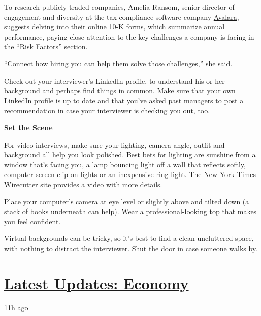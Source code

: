 To research publicly traded companies, Amelia Ransom, senior director of
engagement and diversity at the tax compliance software company
\href{https://www.avalara.com/us/en/index.html}{Avalara}, suggests
delving into their online 10-K forms, which summarize annual
performance, paying close attention to the key challenges a company is
facing in the ``Risk Factors'' section.

``Connect how hiring you can help them solve those challenges,'' she
said.

Check out your interviewer's LinkedIn profile, to understand his or her
background and perhaps find things in common. Make sure that your own
LinkedIn profile is up to date and that you've asked past managers to
post a recommendation in case your interviewer is checking you out, too.

\textbf{Set the Scene}

For video interviews, make sure your lighting, camera angle, outfit and
background all help you look polished. Best bets for lighting are
sunshine from a window that's facing you, a lamp bouncing light off a
wall that reflects softly, computer screen clip-on lights or an
inexpensive ring light.
\href{https://www.nytimes3xbfgragh.onion/wirecutter/blog/video-call-lighting-tips/}{The
New York Times Wirecutter site} provides a video with more details.

Place your computer's camera at eye level or slightly above and tilted
down (a stack of books underneath can help). Wear a professional-looking
top that makes you feel confident.

Virtual backgrounds can be tricky, so it's best to find a clean
uncluttered space, with nothing to distract the interviewer. Shut the
door in case someone walks by.

\hypertarget{latest-updates-economy}{%
\section{\texorpdfstring{\href{https://www.nytimes3xbfgragh.onion/live/2020/08/03/business/stock-market-today-coronavirus?action=click\&pgtype=Article\&state=default\&region=MAIN_CONTENT_1\&context=storylines_live_updates}{Latest
Updates:
Economy}}{Latest Updates: Economy}}\label{latest-updates-economy}}

\href{https://www.nytimes3xbfgragh.onion/live/2020/08/03/business/stock-market-today-coronavirus?action=click\&pgtype=Article\&state=default\&region=MAIN_CONTENT_1\&context=storylines_live_updates\#the-chicago-fed-president-says-its-up-to-congress-to-save-the-economy}{11h
ago}

